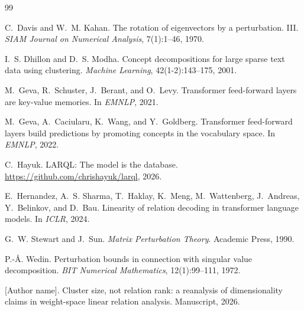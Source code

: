 \documentclass[11pt,letterpaper]{article}
\theoremstyle{definition}
\begin{document}

\begin{thebibliography}{99}

C.~Davis and W.~M. Kahan.
\newblock The rotation of eigenvectors by a perturbation. III.
\newblock \emph{SIAM Journal on Numerical Analysis}, 7(1):1--46, 1970.

I.~S. Dhillon and D.~S. Modha.
\newblock Concept decompositions for large sparse text data using clustering.
\newblock \emph{Machine Learning}, 42(1-2):143--175, 2001.

M.~Geva, R.~Schuster, J.~Berant, and O.~Levy.
\newblock Transformer feed-forward layers are key-value memories.
\newblock In \emph{EMNLP}, 2021.

M.~Geva, A.~Caciularu, K.~Wang, and Y.~Goldberg.
\newblock Transformer feed-forward layers build predictions by promoting concepts in the vocabulary space.
\newblock In \emph{EMNLP}, 2022.

C.~Hayuk.
\newblock LARQL: The model is the database.
\newblock \url{https://github.com/chrishayuk/larql}, 2026.

E.~Hernandez, A.~S. Sharma, T.~Haklay, K.~Meng, M.~Wattenberg, J.~Andreas, Y.~Belinkov, and D.~Bau.
\newblock Linearity of relation decoding in transformer language models.
\newblock In \emph{ICLR}, 2024.

G.~W. Stewart and J.~Sun.
\newblock \emph{Matrix Perturbation Theory}.
\newblock Academic Press, 1990.

P.-\AA. Wedin.
\newblock Perturbation bounds in connection with singular value decomposition.
\newblock \emph{BIT Numerical Mathematics}, 12(1):99--111, 1972.

[Author name].
\newblock Cluster size, not relation rank: a reanalysis of dimensionality claims in weight-space linear relation analysis.
\newblock Manuscript, 2026.

\end{thebibliography}
\end{document}

